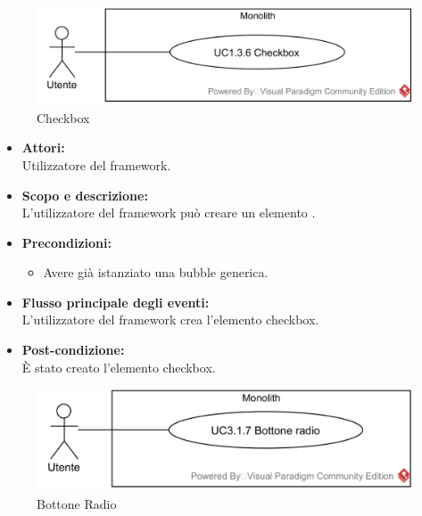 \begin{samepage}
\nopagebreak
\begin{figure}[H]
	\centering
	\includegraphics[width=15cm]{../../documenti/AnalisiDeiRequisiti/Diagrammi_img/usecase/uc1_30.png}
	\caption{\UCFFCaption{} Checkbox}
\end{figure}
\end{samepage}

\begin{itemize}
	\item \textbf{Attori:}
	\\Utilizzatore del framework.
	\item \textbf{Scopo e descrizione:} 
	\\L'utilizzatore del framework può creare un elemento .
	\item \textbf{Precondizioni:}
	\begin{itemize}
		\item Avere già istanziato una bubble generica.
	\end{itemize}
	\item \textbf{Flusso principale degli eventi:}
	\\L'utilizzatore del framework crea l'elemento checkbox.
	\item \textbf{Post-condizione:}
	\\È stato creato l'elemento checkbox.
\end{itemize}

\begin{samepage}
\nopagebreak
\begin{figure}[H]
	\centering
	\includegraphics[width=15cm]{../../documenti/AnalisiDeiRequisiti/Diagrammi_img/usecase/uc1_31.png}
	\caption{\UCFFCaption{} Bottone Radio}
\end{figure}
\end{samepage}

